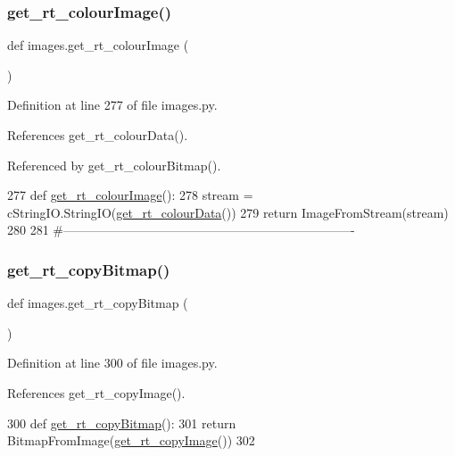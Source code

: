 \subsubsection{\texorpdfstring{get\+\_\+rt\+\_\+colour\+Image()}{get\_rt\_colourImage()}}
{\footnotesize\ttfamily def images.\+get\+\_\+rt\+\_\+colour\+Image (\begin{DoxyParamCaption}{ }\end{DoxyParamCaption})}



Definition at line 277 of file images.\+py.



References get\+\_\+rt\+\_\+colour\+Data().



Referenced by get\+\_\+rt\+\_\+colour\+Bitmap().


\begin{DoxyCode}
277 \textcolor{keyword}{def }\hyperlink{namespaceimages_ab64671d6d1511c9f58621501f4a9c0eb}{get\_rt\_colourImage}():
278     stream = cStringIO.StringIO(\hyperlink{namespaceimages_a8a0eb599a4907ce7cf32360e976a092f}{get\_rt\_colourData}())
279     \textcolor{keywordflow}{return} ImageFromStream(stream)
280 
281 \textcolor{comment}{#----------------------------------------------------------------------}
\end{DoxyCode}
\mbox{\label{namespaceimages_a8c9dc9f544537b5cc82cd4b2d139f90d}} 
\subsubsection{\texorpdfstring{get\+\_\+rt\+\_\+copy\+Bitmap()}{get\_rt\_copyBitmap()}}
{\footnotesize\ttfamily def images.\+get\+\_\+rt\+\_\+copy\+Bitmap (\begin{DoxyParamCaption}{ }\end{DoxyParamCaption})}



Definition at line 300 of file images.\+py.



References get\+\_\+rt\+\_\+copy\+Image().


\begin{DoxyCode}
300 \textcolor{keyword}{def }\hyperlink{namespaceimages_a8c9dc9f544537b5cc82cd4b2d139f90d}{get\_rt\_copyBitmap}():
301     \textcolor{keywordflow}{return} BitmapFromImage(\hyperlink{namespaceimages_a969422c25196c4c9142996c542c8e20c}{get\_rt\_copyImage}())
302 
\end{DoxyCode}
\mbox{\label{namespaceimages_ab5eacef04318a348f0c9e295ce5f6a64}} 
